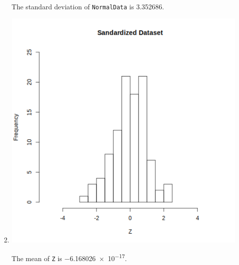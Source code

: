 \documentclass[12pt,letterpaper]{article}
\begin{document}
\begin{enumerate}
\begin{enumerate}
          The standard deviation of \texttt{NormalData} is \num{3.352686}.
        \item
          \includegraphics[width=\linewidth]{prob1b.png}

          The mean of \texttt{Z} is \num{-6.168026e-17}.


\end{enumerate}
\end{enumerate}
\end{document}
